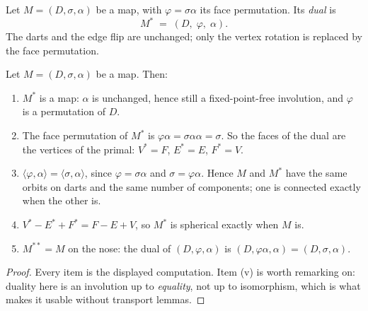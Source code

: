 \begin{definition}\label{def:dual-map}
\Sprose
Let $M = (D, \sigma, \alpha)$ be a map, with $\varphi = \sigma\alpha$ its
face permutation. Its \emph{dual} is
\[
  M^{*} \;=\; (D,\; \varphi,\; \alpha).
\]
The darts and the edge flip are unchanged; only the vertex rotation is
replaced by the face permutation.
\end{definition}

\begin{lemma}\label{prop:dual-map}
Let $M = (D,\sigma,\alpha)$ be a map. Then:
\begin{enumerate}
\item $M^{*}$ is a map: $\alpha$ is unchanged, hence still a fixed-point-free
  involution, and $\varphi$ is a permutation of $D$.
\item The face permutation of $M^{*}$ is $\varphi\alpha = \sigma\alpha\alpha
  = \sigma$. So the faces of the dual are the vertices of the primal:
  $V^{*} = F$, $E^{*} = E$, $F^{*} = V$.
\item $\langle \varphi, \alpha\rangle = \langle \sigma, \alpha\rangle$, since
  $\varphi = \sigma\alpha$ and $\sigma = \varphi\alpha$. Hence $M$ and $M^{*}$
  have the same orbits on darts and the same number of components; one is
  connected exactly when the other is.
\item $V^{*} - E^{*} + F^{*} = F - E + V$, so $M^{*}$ is spherical exactly
  when $M$ is.
\item $M^{**} = M$ on the nose: the dual of $(D,\varphi,\alpha)$ is
  $(D, \varphi\alpha, \alpha) = (D,\sigma,\alpha)$.
\end{enumerate}
\end{lemma}

\begin{proof}
Every item is the displayed computation. Item (v) is worth remarking on:
duality here is an involution up to \emph{equality}, not up to isomorphism,
which is what makes it usable without transport lemmas.
\end{proof}

